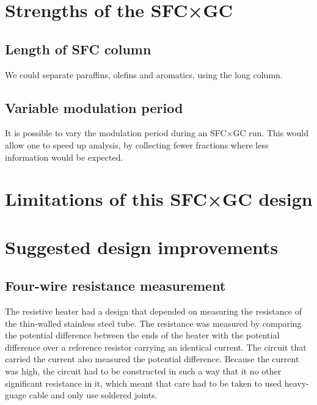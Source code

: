 \section{Strengths of the SFC×GC}

\subsection{Length of SFC column}

We could separate paraffins, olefins and aromatics, using the long column.

\subsection{Variable modulation period}

It is possible to vary the modulation period during an SFC×GC run. This would
allow one to speed up analysis, by collecting fewer fractions where less
information would be expected.

\section{Limitations of this SFC×GC design}

\subsection{}

\section{Suggested design improvements}

\subsection{Four-wire resistance measurement}

The resistive heater had a design that depended on measuring the resistance of
the thin-walled stainless steel tube. The resistance was measured by comparing
the potential difference between the ends of the heater with the potential
difference over a reference resistor carrying an identical current. The circuit
that carried the current also measured the potential difference. Because the
current was high, the circuit had to be constructed in such a way that it no
other significant resistance in it, which meant that care had to be taken to
used heavy-guage cable and only use soldered joints. 

